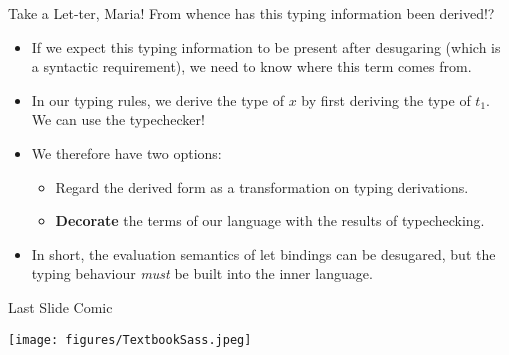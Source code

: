 \documentclass[11pt]{beamer}
\begin{document}
\begin{frame}[fragile=singleslide]{Take a Let-ter, Maria!}
From whence has this typing information been derived!?
\begin{itemize}
\item If we expect this typing information to be present after desugaring (which is a syntactic requirement), we need to know where this term comes from.  
\item In our typing rules, we derive the type of $x$ by first deriving the type of $t_1$. We can use the typechecker!
\item We therefore have two options:
\begin{itemize}
\item Regard the derived form as a transformation on typing derivations.
\item \textbf{Decorate} the terms of our language with the results of typechecking.
\end{itemize}
\item In short, the evaluation semantics of let bindings can be desugared, but the typing behaviour \emph{must} be built into the inner language.  
\end{itemize}
\end{frame}


\begin{frame}[fragile=singleslide]{Last Slide Comic}
\begin{center}
\texttt{[image: figures/TextbookSass.jpeg]}
\end{center}
\end{frame}
\end{document}
